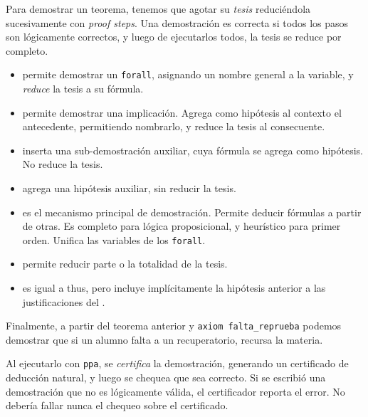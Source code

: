 \begin{figure}[H]
    
\end{figure}

Para demostrar un teorema, tenemos que agotar su \textit{tesis} reduciéndola
sucesivamente con \textit{proof steps}. Una demostración es correcta si todos
los pasos son lógicamente correctos, y luego de ejecutarlos todos, la tesis se
reduce por completo.

\begin{itemize}
    \item \cmdLet{} permite demostrar un \lstinline{forall}, asignando un nombre general a la variable, y \textit{reduce} la tesis a su fórmula.
    \item \cmdSuppose{} permite demostrar una implicación. Agrega como
    hipótesis al contexto el antecedente, permitiendo nombrarlo, y reduce la
    tesis al consecuente.
    \item \cmdClaim{} inserta una sub-demostración auxiliar, cuya fórmula se
    agrega como hipótesis. No reduce la tesis.
    \item \cmdHave{} agrega una hipótesis auxiliar, sin reducir la tesis.
    \item \cmdBy{} es el mecanismo principal de demostración. Permite deducir
    fórmulas a partir de otras. Es completo para lógica proposicional, y
    heurístico para primer orden. Unifica las variables de los \lstinline{forall}.
    \item \cmdThus{} permite reducir parte o la totalidad de la tesis.
    \item \cmdHence{} es igual a thus, pero incluye implícitamente la
    hipótesis anterior a las justificaciones del \cmdBy{}.
\end{itemize}

Finalmente, a partir del teorema anterior y \lstinline{axiom falta_reprueba}
podemos demostrar que si un alumno falta a un recuperatorio, recursa la materia.

\begin{figure}[H]
    
\end{figure}

\lstset{firstnumber=1}

Al ejecutarlo con \texttt{ppa}, se \textit{certifica} la demostración, generando
un certificado de deducción natural, y luego se chequea que sea correcto. Si se
escribió una demostración que no es lógicamente válida, el certificador reporta
el error. No debería fallar nunca el chequeo sobre el certificado.


